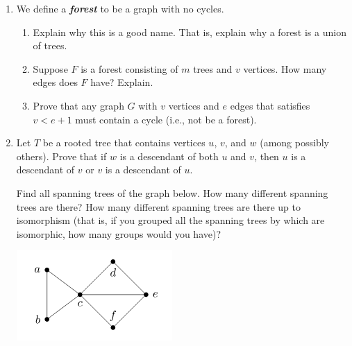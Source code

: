 \documentclass[11pt,a4paper]{article}
\newcommand\setItemNumber[1]{\setcounter{enumi}{\numexpr#1-1\relax}}
\begin{document}
\begin{enumerate}
        \setItemNumber{7}
        \item We define a \textbf{\emph{forest}} to be a graph with no cycles.
            \begin{enumerate}
                \item Explain why this is a good name. That is, explain why a forest is a union of trees.
                \item Suppose $F$ is a forest consisting of $m$ trees and $v$ vertices. How many edges does $F$ have? Explain.
                \item Prove that any graph $G$ with $v$ vertices and $e$ edges that satisfies $v<e+1$ must contain a cycle (i.e., not be a forest).
            \end{enumerate}

        \setItemNumber{11}
        \item Let $T$ be a rooted tree that contains vertices $u$, $v$, and $w$ (among possibly others). Prove that if $w$ is a descendant of both $u$ and $v$, then $u$ is a descendant of $v$ or $v$ is a descendant of $u$.

        \setItemNumber{13} Find all spanning trees of the graph below. How many different spanning trees are there? How many different spanning trees are there up to isomorphism (that is, if you grouped all the spanning trees by which are isomorphic, how many groups would you have)?

            \begin{center}
            \includegraphics[width=.45\textwidth]{hw8_graphic2}
            \end{center}

        \end{enumerate}
	
	
	
		
\end{document}

